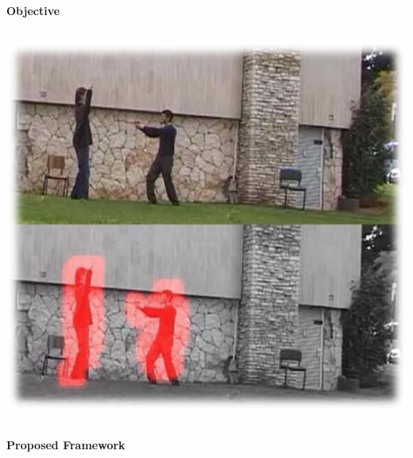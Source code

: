 \begin{frame}{\textbf{Objective}}
\begin{columns}
\begin{column}{0.38\textwidth}
			\includegraphics[width=\textwidth]{./img/example.png} \footnotemark
		\end{column}
	\end{columns}
\end{frame}


\begin{frame}{\textbf{Proposed Framework}}

\end{frame}